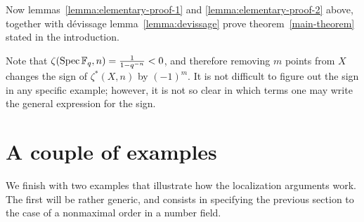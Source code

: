 \documentclass{article}
\numberwithin{equation}{section}
\begin{document}
Now lemmas~\ref{lemma:elementary-proof-1} and \ref{lemma:elementary-proof-2}
above, together with dévissage lemma~\ref{lemma:devissage} prove
theorem~\ref{main-theorem} stated in the introduction.

\begin{remark}
  Note that $\zeta (\operatorname{Spec} \mathbb{F}_q, n) = \frac{1}{1 - q^{-n}} < 0$, and therefore
  removing $m$ points from $X$ changes the sign of $\zeta^* (X,n)$ by
  $(-1)^m$. It is not difficult to figure out the sign in any specific example;
  however, it is not so clear in which terms one may write the general
  expression for the sign.
\end{remark}


\section{A couple of examples}
\label{sec:examples}

We finish with two examples that illustrate how the localization arguments
work. The first will be rather generic, and consists in specifying the previous
section to the case of a nonmaximal order in a number field.
\end{document}
